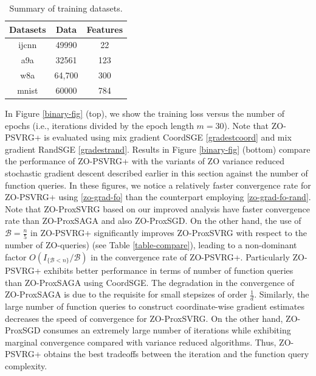 \documentclass{article}
\theoremstyle{definition}
\theoremstyle{remark}
\begin{document}
\begin{table}[htbp]
\begin{center}
\caption{Summary of training datasets.}
\begin{tabular}{ c|c|c } 
 \hline
 Datasets &  Data & Features \\ 
 \hline
  ijcnn & 49990 & 22 \\
  a9a & 32561 & 123 \\ 
 w8a & 64,700  & 300 \\ 
 mnist & 60000 & 784 \\
 \hline
\end{tabular}
\label{metadata}
\end{center}
\end{table}

In Figure \ref{binary-fig} (top), we show the training loss versus the number of epochs (i.e., iterations divided by the
epoch length $m = 30$). Note that ZO-PSVRG+ is evaluated using mix gradient CoordSGE \eqref{gradestcoord} and mix gradient RandSGE \eqref{gradestrand}.
Results in Figure \ref{binary-fig} (bottom) compare the performance of ZO-PSVRG+ with the variants of ZO variance reduced stochastic gradient descent described earlier in this section against the number of function queries. In these figures, we notice  a relatively faster convergence rate for ZO-PSVRG+ using \eqref{zo-grad-fo} than the counterpart employing \eqref{zo-grad-fo-rand}. Note that ZO-ProxSVRG based on
our improved analysis have faster
convergence rate than ZO-ProxSAGA and also ZO-ProxSGD. On the other hand, the use of $\mathcal{B} = \frac{n}{5}$ in ZO-PSVRG+ significantly
improves ZO-ProxSVRG with respect to the number of ZO-queries) (see Table \ref{table-compare}), leading to a non-dominant factor $O(I_{\{\mathcal{B} < n\}}/\mathcal{B})$ in the convergence rate of ZO-PSVRG+. Particularly ZO-PSVRG+ exhibits better performance in terms of number of function queries than ZO-ProxSAGA using CoordSGE.  The degradation in the convergence of ZO-ProxSAGA  is due to the requisite for small stepsizes of order $\frac{1}{d}$. Similarly, the large number of function queries to construct
coordinate-wise gradient estimates decreases the speed of convergence for ZO-ProxSVRG. On the other hand, ZO-ProxSGD consumes an extremely large number of iterations while exhibiting marginal convergence compared with variance reduced algorithms. Thus, ZO-PSVRG+ obtains the best tradeoffs between the iteration and the function query complexity.
\end{document}
